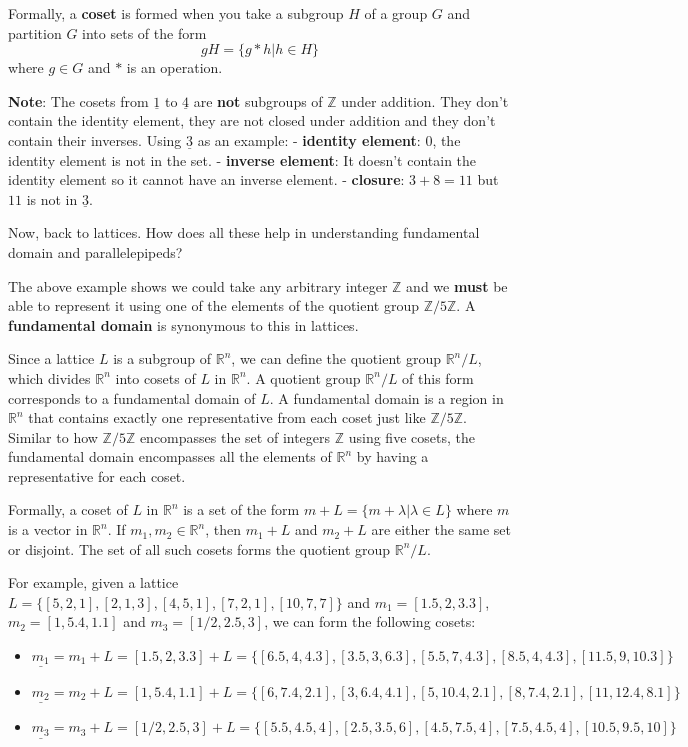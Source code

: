 \documentclass[11pt]{article}
\providecommand{\tightlist}{%
      \setlength{\itemsep}{0pt}\setlength{\parskip}{0pt}}
\begin{document}
Formally, a \textbf{coset} is formed when you take a subgroup \(H\) of a
group \(G\) and partition \(G\) into sets of the form
\[gH = \{g * h | h \in H\}\] where \(g \in G\) and \(*\) is an
operation.

\textbf{Note}: The cosets from \(\underline{1}\) to \(\underline{4}\)
are \textbf{not} subgroups of \(\mathbb{Z}\) under addition. They don't
contain the identity element, they are not closed under addition and
they don't contain their inverses. Using \(\underline{3}\) as an
example: - \textbf{identity element}: \(0\), the identity element is not
in the set. - \textbf{inverse element}: It doesn't contain the identity
element so it cannot have an inverse element. - \textbf{closure}:
\(3 + 8 = 11\) but \(11\) is not in \(\underline{3}\).

Now, back to lattices. How does all these help in understanding
fundamental domain and parallelepipeds?

The above example shows we could take any arbitrary integer
\(\mathbb{Z}\) and we \textbf{must} be able to represent it using one of
the elements of the quotient group \(\mathbb{Z}/5\mathbb{Z}\). A
\textbf{fundamental domain} is synonymous to this in lattices.

Since a lattice \(L\) is a subgroup of \(\mathbb{R}^n\), we can define
the quotient group \(\mathbb{R}^n/L\), which divides \(\mathbb{R}^n\)
into cosets of \(L\) in \(\mathbb{R}^n\). A quotient group
\(\mathbb{R}^n/L\) of this form corresponds to a fundamental domain of
\(L\). A fundamental domain is a region in \(\mathbb{R}^n\) that
contains exactly one representative from each coset just like
\(\mathbb{Z}/5\mathbb{Z}\). Similar to how \(\mathbb{Z}/5\mathbb{Z}\)
encompasses the set of integers \(\mathbb{Z}\) using five cosets, the
fundamental domain encompasses all the elements of \(\mathbb{R}^n\) by
having a representative for each coset.

Formally, a coset of \(L\) in \(\mathbb{R}^n\) is a set of the form
\(m + L = \{m + \lambda | \lambda \in L \}\) where \(m\) is a vector in
\(\mathbb{R}^n\). If \(m_1, m_2 \in \mathbb{R}^n\), then \(m_1 + L\) and
\(m_2 + L\) are either the same set or disjoint. The set of all such
cosets forms the quotient group \(\mathbb{R}^n/L\).

For example, given a lattice
\(L = \{[5, 2, 1], [2, 1, 3], [4, 5, 1], [7, 2, 1], [10, 7, 7]\}\) and
\(m_1 = [1.5, 2, 3.3]\), \(m_2 = [1, 5.4, 1.1]\) and
\(m_3 = [1/2, 2.5, 3]\), we can form the following cosets:

\begin{itemize}
\tightlist
\item
  \(\underline{m_1} = m_1 + L = [1.5, 2, 3.3] + L = \{[6.5, 4,  4.3], [3.5,  3,  6.3], [5.5,  7,  4.3], [8.5,  4,  4.3], [11.5,  9, 10.3]\}\)
\item
  \(\underline{m_2} = m_2 + L = [1, 5.4, 1.1] + L = \{[6,  7.4,  2.1], [3,  6.4,  4.1], [5, 10.4,  2.1], [8, 7.4,  2.1], [11, 12.4,  8.1]\}\)
\item
  \(\underline{m_3} = m_3 + L = [1/2, 2.5, 3] + L = \{[5.5,  4.5,  4], [2.5,  3.5,  6], [4.5,  7.5,  4], [7.5,  4.5,  4], [10.5,  9.5, 10]\}\)
\end{itemize}
\end{document}
